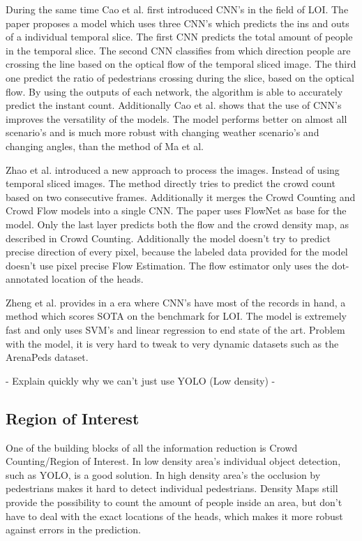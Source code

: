 \documentclass{article}
\begin{document}
During the same time Cao et al. \cite{cao_large_2015} first introduced CNN's in the field of LOI. The paper proposes a model which uses three CNN's which predicts the ins and outs of a individual temporal slice. The first CNN predicts the total amount of people in the temporal slice. The second CNN classifies from which direction people are crossing the line based on the optical flow of the temporal sliced image. The third one predict the ratio of pedestrians crossing during the slice, based on the optical flow. By using the outputs of each network, the algorithm is able to accurately predict the instant count. Additionally Cao et al. \cite{cao_large_2015} shows that the use of CNN's improves the versatility of the models. The model performs better on almost all scenario's and is much more robust with changing weather scenario's and changing angles, than the method of Ma et al. \cite{ma_counting_2016}

Zhao et al. \cite{leibe_crossing-line_2016} introduced a new approach to process the images. Instead of using temporal sliced images. The method directly tries to predict the crowd count based on two consecutive frames. Additionally it merges the Crowd Counting and Crowd Flow models into a single CNN. The paper uses FlowNet as base for the model. Only the last layer predicts both the flow and the crowd density map, as described in Crowd Counting. Additionally the model doesn't try to predict precise direction of every pixel, because the labeled data provided for the model doesn't use pixel precise Flow Estimation. The flow estimator only uses the dot-annotated location of the heads.

Zheng et al. \cite{zheng_cross-line_2019} provides in a era where CNN's have most of the records in hand, a method which scores SOTA on the benchmark for LOI. The model is extremely fast and only uses SVM's and linear regression to end state of the art. Problem with the model, it is very hard to tweak to very dynamic datasets such as the ArenaPeds dataset.



- Explain quickly why we can't just use YOLO (Low density)
-

\subsection{Region of Interest}
One of the building blocks of all the information reduction is Crowd Counting/Region of Interest. In low density area's individual object detection, such as YOLO, is a good solution. In high density area's the occlusion by pedestrians makes it hard to detect individual pedestrians. Density Maps still provide the possibility to count the amount of people inside an area, but don't have to deal with the exact locations of the heads, which makes it more robust against errors in the prediction.
\end{document}
